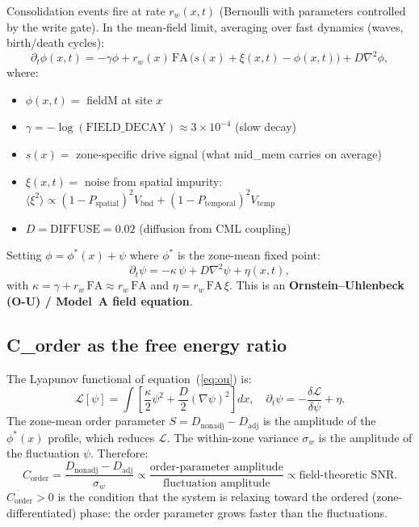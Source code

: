 \documentclass[11pt,a4paper]{article}
\newcommand{\Corder}{C_{\mathrm{order}}}
\newcommand{\sw}{\sigma_w}
\newcommand{\Psp}{P_{\mathrm{spatial}}}
\newcommand{\Ptemp}{P_{\mathrm{temporal}}}
\newcommand{\Lf}{\mathcal{L}}
\begin{document}
Consolidation events fire at rate $r_w(x,t)$ (Bernoulli with parameters
controlled by the write gate).
In the mean-field limit, averaging over fast dynamics (waves, birth/death cycles):
\begin{equation}
  \partial_t \phi(x,t) = -\gamma\phi + r_w(x)\,\mathrm{FA}\,
  \bigl(s(x) + \xi(x,t) - \phi(x,t)\bigr) + D\nabla^2\phi,
  \label{eq:field}
\end{equation}
where:
\begin{itemize}
  \item $\phi(x,t) = $ fieldM at site $x$
  \item $\gamma = -\log(\mathrm{FIELD\_DECAY}) \approx 3\times 10^{-4}$ (slow decay)
  \item $s(x) = $ zone-specific drive signal (what mid\_mem carries on average)
  \item $\xi(x,t) = $ noise from spatial impurity: $\langle\xi^2\rangle
    \propto (1-\Psp)^2 V_\mathrm{bnd} + (1-\Ptemp)^2 V_\mathrm{temp}$
  \item $D = \mathrm{DIFFUSE} = 0.02$ (diffusion from CML coupling)
\end{itemize}

Setting $\phi = \phi^*(x) + \psi$ where $\phi^*$ is the zone-mean fixed point:
\begin{equation}
  \partial_t \psi = -\kappa\,\psi + D\nabla^2\psi + \eta(x,t),
  \label{eq:ou}
\end{equation}
with $\kappa = \gamma + r_w\,\mathrm{FA} \approx r_w\,\mathrm{FA}$ and
$\eta = r_w\,\mathrm{FA}\,\xi$.
This is an \textbf{Ornstein--Uhlenbeck (O-U) / Model~A field equation}.

\subsection{C\_order as the free energy ratio}

The Lyapunov functional of equation~(\ref{eq:ou}) is:
\begin{equation}
  \Lf[\psi] = \int \left[\frac{\kappa}{2}\psi^2
    + \frac{D}{2}(\nabla\psi)^2\right] dx,
  \quad
  \partial_t\psi = -\frac{\delta\Lf}{\delta\psi} + \eta.
  \label{eq:lyap}
\end{equation}
The zone-mean order parameter $S = D_\mathrm{nonadj} - D_\mathrm{adj}$
is the amplitude of the $\phi^*(x)$ profile, which reduces $\Lf$.
The within-zone variance $\sw$ is the amplitude of the fluctuation $\psi$.
Therefore:
\begin{equation}
  \boxed{
  \Corder = \frac{D_\mathrm{nonadj} - D_\mathrm{adj}}{\sw}
  \propto \frac{\text{order-parameter amplitude}}{\text{fluctuation amplitude}}
  \propto \text{field-theoretic SNR.}
  }
\end{equation}
$\dot{\Corder} > 0$ is the condition that the system is relaxing toward the
ordered (zone-differentiated) phase: the order parameter grows faster than
the fluctuations.
\end{document}
